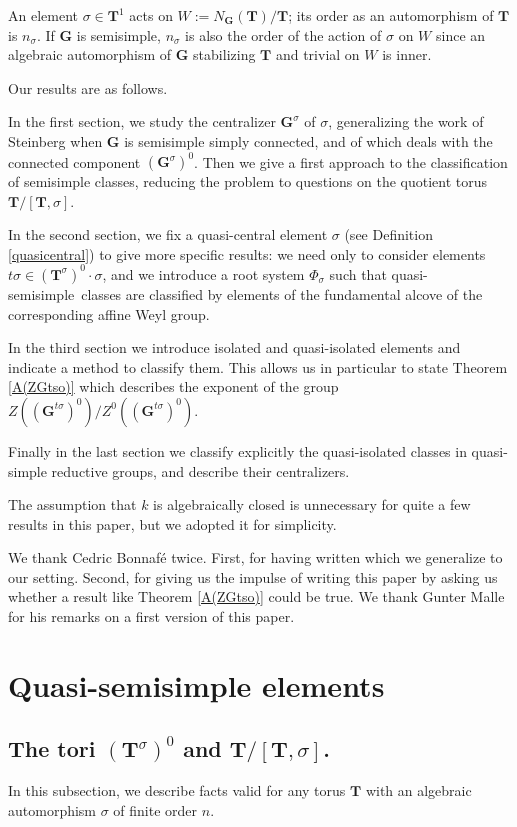 \documentclass{amsart}
\numberwithin{equation}{section}
\theoremstyle{definition}
\theoremstyle{remark}
\newcommand\bG{{\mathbf G}}
\newcommand\bT{{\mathbf T}}
\newcommand\Tun{{\bT^1}}
\newcommand\Gtso{{(\bG^{t\sigma})^0}}
\newcommand\Gs{{\bG^\sigma}}
\newcommand\Gso{{(\Gs)^0}}
\newcommand\Tso{{(\bT^\sigma)^0}}
\newcommand\LT{{\bT/[\bT,\sigma]}}
\newcommand\qss{quasi-semisimple}
\begin{document}
An element  $\sigma\in\Tun$ acts  on $W:=N_\bG(\bT)/\bT$; 
its order as an automorphism of $\bT$ is $n_\sigma$. If $\bG$ is semisimple,
$n_\sigma$ is also the order of the action of $\sigma$ on $W$ since 
an algebraic automorphism of $\bG$ stabilizing $\bT$ and trivial on $W$
is inner.

Our results are as follows.

In  the  first  section,  we  study  the  centralizer  $\Gs$  of  $\sigma$,
generalizing  the  work  of  Steinberg  \cite{St}  when $\bG$ is semisimple
simply  connected,  and  of  \cite{grnc}  which  deals  with  the connected
component  $\Gso$. Then we  give a first  approach to the classification of
semisimple  classes,  reducing  the  problem  to questions on the quotient
torus $\LT$.

In  the  second  section,  we  fix  a  quasi-central  element $\sigma$ (see
Definition \ref{quasicentral}) to give more specific results: we need only to consider
elements  $t\sigma\in\Tso\cdot\sigma$,  and  we  introduce  a  root  system
$\Phi_\sigma$  such that  \qss\ classes  are classified  by elements of the
fundamental alcove of the corresponding affine Weyl group.

In the third section we introduce isolated and quasi-isolated elements and
indicate a method to classify them.
This allows us in particular to state Theorem \ref{A(ZGtso)}
which describes the exponent of the group $Z(\Gtso)/Z^0(\Gtso)$.

Finally in the last section we classify explicitly the quasi-isolated classes
in quasi-simple reductive groups, and describe their centralizers.

The assumption that $k$ is algebraically closed is unnecessary for quite a few
results in this paper, but we adopted it for simplicity.

We  thank Cedric Bonnaf\'e  twice. First, for  having written \cite{cedric}
which we generalize to our setting. Second, for giving us the
impulse  of writing this paper by asking us whether a result like Theorem \ref{A(ZGtso)}
could be true.
We thank Gunter Malle for his remarks on a first version of this paper.
\section{Quasi-semisimple elements}
\subsection*{The tori $\Tso$ and $\LT$.}
In this subsection, we describe facts valid for any torus
$\bT$ with an algebraic automorphism $\sigma$ of finite order $n$. 
\end{document}
